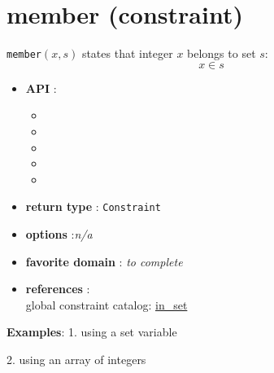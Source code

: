 \label{member}
\hypertarget{member}{}

\section{member (constraint)}\label{member:memberconstraint}\hypertarget{member:memberconstraint}{}

\begin{notedef}
  \texttt{member}$(x,s)$ states that integer $x$ belongs to set $s$:
$$x\in s$$
\end{notedef}

\begin{itemize}
	\item \textbf{API} :
	\begin{itemize}
		\item {}
		\item {}
		\item {}
		\item {}
		\item {}
	\end{itemize}
	\item \textbf{return type} : \texttt{Constraint}
	\item \textbf{options} :\emph{n/a}
	\item \textbf{favorite domain} : \emph{to complete}
	\item \textbf{references} :\\
      global constraint catalog: \href{http://www.emn.fr/x-info/sdemasse/gccat/Cin_set.html}{in\_set}
\end{itemize}

\textbf{Examples}:
1. using a set variable


2. using an array of integers

